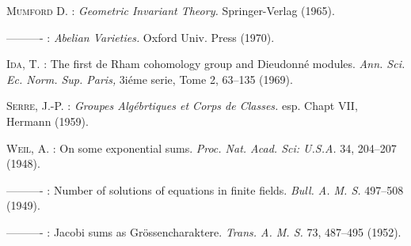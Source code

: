 \begin{thebibliography}{99}
 \textsc{Mumford} D. : {\em Geometric Invariant Theory.} Springer-Verlag (1965).

 ---------- : {\em Abelian Varieties.} Oxford Univ. Press (1970).

 \textsc{Ida,} T. : The first de Rham cohomology group and Dieudonn\'e modules. {\em Ann. Sci. Ec. Norm. Sup. Paris,} 3i\'eme serie, Tome 2, 63--135 (1969).

 \textsc{Serre,} J.-P. : {\em Groupes Alg\'ebrtiques et Corps de Classes.} esp. Chapt VII, Hermann (1959).

 \textsc{Weil,} A. : On some exponential sums. {\em Proc. Nat. Acad. Sci: U.S.A.} 34, 204--207 (1948).

 ---------- : Number of solutions of equations in finite fields. {\em Bull. A. M. S.} 497--508 (1949).

 ---------- : Jacobi sums as Gr\"ossencharaktere. {\em Trans. A. M. S.} 73, 487--495 (1952).

\end{thebibliography}
